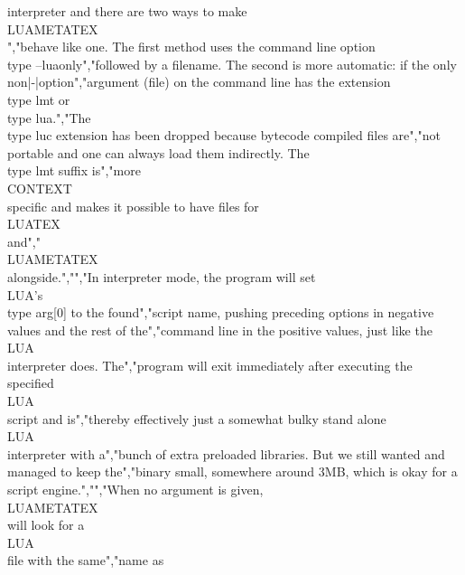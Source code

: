 interpreter and there are two ways to make \\LUAMETATEX\\","behave like one. The first method uses the command line option \\type {--luaonly}","followed by a filename. The second is more automatic: if the only non|-|option","argument (file) on the command line has the extension \\type {lmt} or \\type {lua}.","The \\type {luc} extension has been dropped because bytecode compiled files are","not portable and one can always load them indirectly. The \\type {lmt} suffix is","more \\CONTEXT\\ specific and makes it possible to have files for \\LUATEX\\ and","\\LUAMETATEX\\ alongside.","","In interpreter mode, the program will set \\LUA's \\type {arg[0]} to the found","script name, pushing preceding options in negative values and the rest of the","command line in the positive values, just like the \\LUA\\ interpreter does. The","program will exit immediately after executing the specified \\LUA\\ script and is","thereby effectively just a somewhat bulky stand alone \\LUA\\ interpreter with a","bunch of extra preloaded libraries. But we still wanted and managed to keep the","binary small, somewhere around 3MB, which is okay for a script engine.","","When no argument is given, \\LUAMETATEX\\ will look for a \\LUA\\ file with the same","name as 